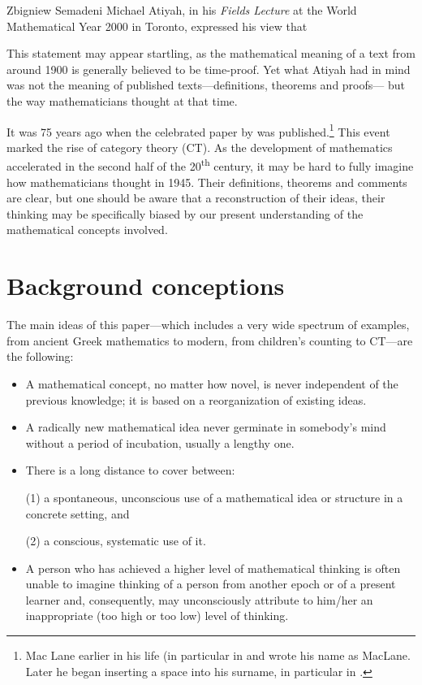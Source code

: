 \begin{artengenv}{Zbigniew Semadeni}
Michael Atiyah, in his \textit{Fields Lecture} at the World Mathematical Year 2000 
in Toronto, expressed his view that 

This statement may appear startling, as the mathematical meaning of a text from 
around 1900 is generally believed to be time-proof. Yet what Atiyah had in mind was 
not the meaning of published texts---definitions, theorems and proofs---
but the way mathematicians thought at that time. 

It was 75 years ago when the celebrated paper by 
\citeauthor{E-ML} was published.\footnote{Mac Lane earlier in his life (in particular 
in \parencite{E-ML} and \parencite{Duality} wrote his name as MacLane. Later he 
began inserting a space into his surname, in particular in \parencite{Working}. } 
This event marked the rise of category theory (CT). As the 
development of mathematics accelerated in the second half of the 20\textsuperscript{th} century, 
it may be hard to fully imagine how mathematicians thought in 1945. Their 
definitions, theorems and comments are clear, but one should be aware that a 
reconstruction of their ideas, their thinking may be specifically biased by our 
present understanding of the mathematical concepts involved. 

\section{Background conceptions}
The main ideas of this paper---which includes a very wide spectrum 
of examples, from ancient Greek mathematics to modern, from children’s counting 
to CT---are the following: 
\begin{itemize} 
\item A mathematical concept, no matter how novel, is never independent of the 
previous knowledge; it is based on a reorganization of existing ideas. 
\item A radically new mathematical idea never germinate in somebody's mind 
without a period of incubation, usually a lengthy one. 
\item There is a long distance to cover between: \par 
(1) a spontaneous, unconscious use of a mathematical idea or structure in a concrete 
setting, and \par 
(2) a conscious, systematic use of it. 
\item A person who has achieved a higher level of mathematical thinking is often 
unable to imagine thinking of a person from another epoch or of a present learner 
and, consequently, may unconsciously attribute to him/her an inappropriate (too high 
or too low) level of thinking.  
\end{itemize}


\end{artengenv}
